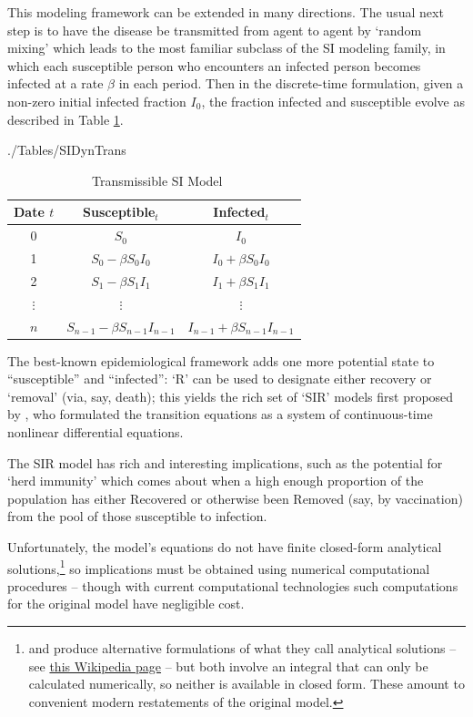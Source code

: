 This modeling framework can be extended in many directions.  The usual next step is to have the disease be transmitted from agent to agent by `random mixing' which leads to the most familiar subclass of the SI modeling family, in which each susceptible person who encounters an infected person becomes infected at a rate $\beta$ in each period. Then in the discrete-time formulation, given a non-zero initial infected fraction $I_0$, the fraction  infected and susceptible evolve as described in Table \ref{table:SIDynTrans}.

\begin{verbatimwrite}{./Tables/SIDynTrans}
  \begin{table}[ht]
    \medskip
    \caption{ ~Transmissible SI Model}\label{table:SIDynTrans}
    \centering\medskip
    \begin{tabular}{ccc}
      \hline
      Date $t$ & Susceptible$_{t}$ & Infected$_{t}$ \\
      \hline
      0 & $S_0$  &  $I_0$ \\
      \hline
      1 & $S_0 - \beta S_0I_0$ & $I_0+\beta S_0I_0$ \\
      \hline
      2 & $S_1-\beta S_1I_1$ & $I_1+\beta S_1I_1$ \\
      \hline
      $\vdots$ & $\vdots$ & $\vdots$ \\
      \hline
      $n$ & $S_{n-1}-\beta S_{n-1}I_{n-1}$ & $I_{n-1}+\beta S_{n-1}I_{n-1}$ \\
      \hline
    \end{tabular}
  \end{table}
\end{verbatimwrite}


The best-known epidemiological framework adds one more potential state to ``susceptible'' and ``infected'':  `R' can be used to designate either recovery or `removal' (via, say, death); this yields the rich set of `SIR' models first proposed by \cite{kermack_contribution_1927}, who formulated the transition equations as a system of continuous-time nonlinear differential equations.

The SIR model has rich and interesting implications, such as the potential for `herd immunity' which comes about when a high enough proportion of the population has either Recovered or otherwise been Removed (say, by vaccination) from the pool of those susceptible to infection.

Unfortunately, the model's equations do not have finite closed-form analytical solutions,\footnote{\cite{miller2012note} and \cite{harko2014exact}  produce alternative formulations of what they call analytical solutions -- see   \href{https://en.wikipedia.org/wiki/Compartmental_models_in_epidemiology\#Transition_rates}{this Wikipedia page} -- but both involve an integral that can only be calculated numerically, so neither is available in closed form.  These amount to convenient modern restatements of the original \cite{kermack_contribution_1927} model.} so implications must be obtained using numerical computational procedures -- though with current computational technologies such computations for the original \cite{kermack_contribution_1927} model have negligible cost.

